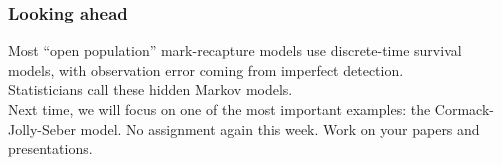 \documentclass[color=usenames,dvipsnames]{beamer}\usepackage[]{graphicx}\usepackage[]{color}
\begin{document}
\begin{frame}
  \frametitle{Looking ahead}
  Most ``open population'' mark-recapture models use discrete-time
  survival models, with observation error coming from imperfect
  detection. \\
  \pause
  \vfill
  Statisticians call these hidden Markov models. \\
  \pause
  \vfill
  Next time, we will focus on one of the most important examples: the
  Cormack-Jolly-Seber model.
  \pause
  \vfill
  No assignment again this week. Work on your papers and
  presentations. 
\end{frame}












\end{document}
